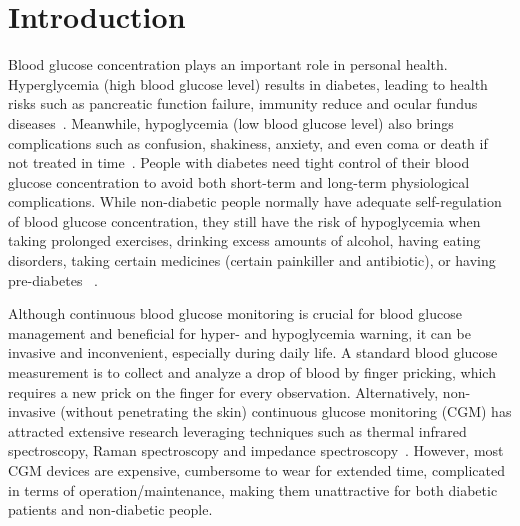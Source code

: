 
\section{Introduction}
\label{sec:intro}
Blood glucose concentration plays an important role in personal health.
Hyperglycemia (high blood glucose level) results in diabetes, leading to health risks such as pancreatic function failure, immunity reduce and ocular fundus diseases~\cite{bib:DC95:Klein}.
Meanwhile, hypoglycemia (low blood glucose level) also brings complications such as confusion, shakiness, anxiety, and even coma or death if not treated in time~\cite{bib:AJM91:DCCT}.
People with diabetes need tight control of their blood glucose concentration to avoid both short-term and long-term physiological complications.
While non-diabetic people normally have adequate self-regulation of blood glucose concentration, they still have the risk of hypoglycemia when taking prolonged exercises, drinking excess amounts of alcohol, having eating disorders, taking certain medicines (\eg certain painkiller and antibiotic), or having pre-diabetes~\cite{bib:JCEM13:Eckert} \cite{bib:NEJM82:Felig}.

Although continuous blood glucose monitoring is crucial for blood glucose management and beneficial for hyper- and hypoglycemia warning, it can be invasive and inconvenient, especially during daily life.
A standard blood glucose measurement is to collect and analyze a drop of blood by finger pricking, which requires a new prick on the finger for every observation.
Alternatively, non-invasive (without penetrating the skin) continuous glucose monitoring (CGM) has attracted extensive research leveraging techniques such as thermal infrared spectroscopy, Raman spectroscopy and impedance spectroscopy~\cite{bib:JDST10:Vaddiraju}.
However, most CGM devices are expensive, cumbersome to wear for extended time, complicated in terms of operation/maintenance, making them unattractive for both diabetic patients and non-diabetic people.

